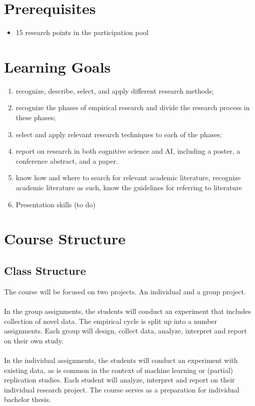 \documentclass[11pt]{article}
\begin{document}
\section*{Prerequisites}
\begin{itemize}
\item 15 research points in the participation pool
\end{itemize}

\section*{Learning Goals}
\begin{enumerate}
\item recognize, describe, select, and apply different research methods;
\item recognize the phases of empirical research and divide the research process in these phases;
\item select and apply relevant research techniques to each of the phases;
\item report on research in both cognitive science and AI, including a poster, a conference abstract, and a paper.
\item know how and where to search for relevant academic literature, recognize academic literature as such, know the guidelines for referring to literature
\item Presentation skills (to do)


\end{enumerate}


\section*{Course Structure}

\subsection*{Class Structure}

The course will be focused on two projects. An individual and a group project.\\ 
\\
In the group assignments, the students will conduct an experiment that includes collection of novel data. The empirical cycle is split up into a number assignments. Each group will design, collect data, analyze, interpret and report on their own study.\\
\\
In the individual assignments, the students will conduct an experiment with existing data, as is common in the context of machine learning or (partial) replication studies. Each student will analyze, interpret and report on their individual research project.
The course serves as a preparation for individual bachelor thesis. 
\end{document}
